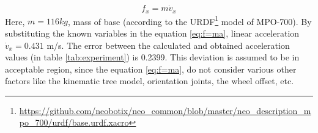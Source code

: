 \begin{equation}\label{eq:f=ma}
f_x = m \dot{v}_x
\end{equation}
Here, $m = 116kg$, mass of base (according to the URDF\footnote{\url{https://github.com/neobotix/neo_common/blob/master/neo_description_mpo_700/urdf/base.urdf.xacro}} model of MPO-700). By substituting the known variables in the equation \ref{eq:f=ma}, linear acceleration $\dot{v}_x = 0.431$ m/s. The error between the calculated and obtained acceleration values (in table \ref{tab:experiment}) is 0.2399. This deviation is assumed to be in acceptable region, since the equation \ref{eq:f=ma}, do not consider various other factors like the kinematic tree model, orientation joints, the wheel offset, etc. 
%			
%			
%			
